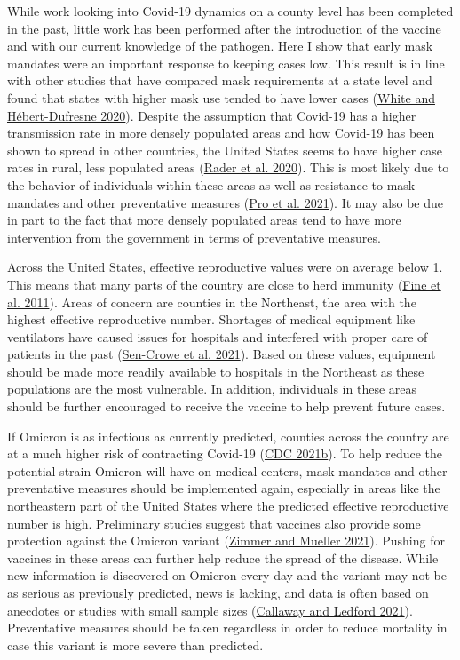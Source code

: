 \documentclass[
  12pt,
]{article}
\begin{document}
While work looking into Covid-19 dynamics on a county level has been completed in the past, little work has been performed after the introduction of the vaccine and with our current knowledge of the pathogen. Here I show that early mask mandates were an important response to keeping cases low. This result is in line with other studies that have compared mask requirements at a state level and found that states with higher mask use tended to have lower cases (\protect\hyperlink{ref-white_state-level_2020}{White and Hébert-Dufresne 2020}). Despite the assumption that Covid-19 has a higher transmission rate in more densely populated areas and how Covid-19 has been shown to spread in other countries, the United States seems to have higher case rates in rural, less populated areas (\protect\hyperlink{ref-rader_crowding_2020}{Rader et al. 2020}). This is most likely due to the behavior of individuals within these areas as well as resistance to mask mandates and other preventative measures (\protect\hyperlink{ref-pro_us_2021}{Pro et al. 2021}). It may also be due in part to the fact that more densely populated areas tend to have more intervention from the government in terms of preventative measures.

Across the United States, effective reproductive values were on average below 1. This means that many parts of the country are close to herd immunity (\protect\hyperlink{ref-fine_herd_2011}{Fine et al. 2011}). Areas of concern are counties in the Northeast, the area with the highest effective reproductive number. Shortages of medical equipment like ventilators have caused issues for hospitals and interfered with proper care of patients in the past (\protect\hyperlink{ref-sen-crowe_closer_2021}{Sen-Crowe et al. 2021}). Based on these values, equipment should be made more readily available to hospitals in the Northeast as these populations are the most vulnerable. In addition, individuals in these areas should be further encouraged to receive the vaccine to help prevent future cases.

If Omicron is as infectious as currently predicted, counties across the country are at a much higher risk of contracting Covid-19 (\protect\hyperlink{ref-cdc_omicron_2021}{CDC 2021b}). To help reduce the potential strain Omicron will have on medical centers, mask mandates and other preventative measures should be implemented again, especially in areas like the northeastern part of the United States where the predicted effective reproductive number is high. Preliminary studies suggest that vaccines also provide some protection against the Omicron variant (\protect\hyperlink{ref-zimmer_covid_2021}{Zimmer and Mueller 2021}). Pushing for vaccines in these areas can further help reduce the spread of the disease. While new information is discovered on Omicron every day and the variant may not be as serious as previously predicted, news is lacking, and data is often based on anecdotes or studies with small sample sizes (\protect\hyperlink{ref-callaway_how_2021}{Callaway and Ledford 2021}). Preventative measures should be taken regardless in order to reduce mortality in case this variant is more severe than predicted.
\end{document}
